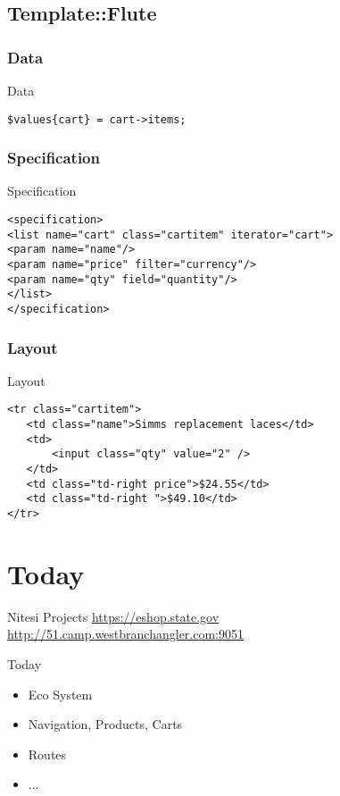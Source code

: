 \subsection{Template::Flute}
\subsubsection{Data}
\begin{frame}[fragile]{Data}
\begin{lstlisting}
$values{cart} = cart->items;
\end{lstlisting}
\end{frame}

\subsubsection{Specification}
\begin{frame}[fragile]{Specification}
\begin{lstlisting}
<specification>
<list name="cart" class="cartitem" iterator="cart">
<param name="name"/>
<param name="price" filter="currency"/>
<param name="qty" field="quantity"/>
</list>
</specification>
\end{lstlisting}
\end{frame}

\subsubsection{Layout}
\begin{frame}[fragile]{Layout}
\begin{lstlisting}
<tr class="cartitem">
   <td class="name">Simms replacement laces</td>
   <td>
       <input class="qty" value="2" />
   </td>
   <td class="td-right price">$24.55</td>
   <td class="td-right ">$49.10</td>
</tr>
\end{lstlisting}
\end{frame}

\section{Today}
\begin{frame}{Nitesi Projects}
\url{https://eshop.state.gov}
\url{http://51.camp.westbranchangler.com:9051}
\end{frame}

\begin{frame}{Today}
\begin{itemize}
\item Eco System
\item Navigation, Products, Carts
\item Routes
\item ...
\end{itemize}
\end{frame}

